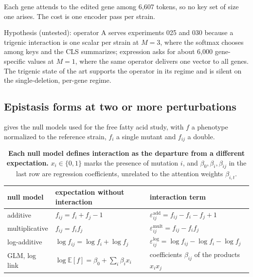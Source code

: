  Each gene
attends to the edited gene among 6{,}607 tokens, so no key set of size one arises. The
cost is one encoder pass per strain.

Hypothesis (untested): operator A serves experiments 025 and 030 because a trigenic
interaction is one scalar per strain at $M=3$, where the softmax chooses among keys and the
CLS summarizes; expression asks for about 6{,}000 gene-specific values at $M=1$, where the
same operator delivers one vector to all genes. The trigenic state of the art supports
the operator in its regime and is silent on the single-deletion, per-gene regime.

\subsection{Epistasis forms at two or more perturbations}

 gives the null models used for the free fatty acid study, with $f$ a
phenotype normalized to the reference strain, $f_i$ a single mutant and $f_{ij}$ a double.

\begin{table}[h]
\footnotesize
\caption[Null models of genetic interaction]{\textbf{Each null model defines interaction
as the departure from a different expectation.} $x_i\in\{0,1\}$ marks the presence of
mutation $i$, and $\beta_0,\beta_i,\beta_{ij}$ in the last row are regression coefficients,
unrelated to the attention weights $\beta_{i,t}$.
}
\label{tab:epistasis}
\begin{tabular}{@{}lll@{}}
\toprule
null model & expectation without interaction & interaction term \\
\midrule
additive & $f_{ij}=f_i+f_j-1$ & $\varepsilon^{\mathrm{add}}_{ij}=f_{ij}-f_i-f_j+1$ \\
multiplicative & $f_{ij}=f_if_j$ & $\varepsilon^{\mathrm{mult}}_{ij}=f_{ij}-f_if_j$ \\
log-additive & $\log f_{ij}=\log f_i+\log f_j$ & $\varepsilon^{\log}_{ij}=\log f_{ij}-\log f_i-\log f_j$ \\
GLM, log link & $\log\mathbb{E}[f]=\beta_0+\sum_i\beta_ix_i$ & coefficients $\beta_{ij}$ of the products $x_ix_j$ \\
\bottomrule
\end{tabular}
\end{table}

